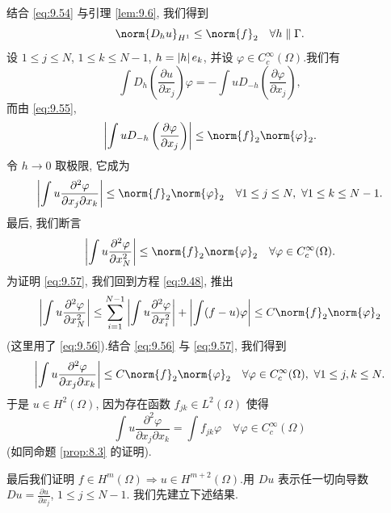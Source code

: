 结合 \eqref{eq:9.54} 与引理  \ref{lem:9.6}, 我们得到
\begin{equation}
\norm{D_hu}_{H^1}\le\norm{f}_2\quad\forall h\parallel\Gamma.
\label{eq:9.55}
\end{equation}
设 $1\le j\le N$, $1\le k\le N-1$, $h=\left|h\right|e_k$, 并设
$\varphi\in C_c^\infty(\Omega)$.我们有
\begin{equation*}
\int D_h\left(\frac{\partial u}{\partial x_j}\right)\varphi
=-\int uD_{-h}\left(\frac{\partial\varphi}{\partial x_j}\right),
\end{equation*}
而由 \eqref{eq:9.55},
\begin{equation*}
\left|\int uD_{-h}\left(\frac{\partial\varphi}{\partial x_j}\right)\right|
\le\norm{f}_2\norm{\varphi}_2.
\end{equation*}
令 $h\to0$ 取极限, 它成为
\begin{equation}
\left|\int u\frac{\partial^2\varphi}{\partial x_j\partial x_k}\right|
\le\norm{f}_2\norm{\varphi}_2
\quad\forall1\le j\le N,\ \forall1\le k\le N-1.
\label{eq:9.56}
\end{equation}
最后, 我们断言
\begin{equation}
\left|\int u\frac{\partial^2\varphi}{\partial x_N^2}\right|
\le\norm{f}_2\norm{\varphi}_2\quad\forall\varphi\in C_c^\infty(\Omega).
\label{eq:9.57}
\end{equation}
为证明 \eqref{eq:9.57}, 我们回到方程 \eqref{eq:9.48}, 推出
\begin{equation*}
\left|\int u\frac{\partial^2\varphi}{\partial x_N^2}\right|
\le\sum_{i=1}^{N-1}\left|\int u\frac{\partial^2\varphi}{\partial x_i^2}\right|
+\left|\int(f-u)\varphi\right|\le C\norm{f}_2\norm{\varphi}_2
\end{equation*}
(这里用了 \eqref{eq:9.56}).结合 \eqref{eq:9.56} 与 \eqref{eq:9.57}, 我们得到
\begin{equation*}
\left|\int u\frac{\partial^2\varphi}{\partial x_j\partial x_k}\right|
\le C\norm{f}_2\norm{\varphi}_2
\quad\forall\varphi\in C_c^\infty(\Omega),\ \forall1\le j,k\le N.
\end{equation*}
于是 $u\in H^2(\Omega)$, 因为存在函数 $f_{jk}\in L^2(\Omega)$ 使得
\begin{equation*}
\int u\frac{\partial^2\varphi}{\partial x_j\partial x_k}
=\int f_{jk}\varphi\quad\forall\varphi\in C_c^\infty(\Omega)
\end{equation*}
(如同命题  \ref{prop:8.3} 的证明).

最后我们证明 $f\in H^m(\Omega)\Rightarrow u\in H^{m+2}(\Omega)$.用 $Du$
表示任一切向导数 $Du=\frac{\partial u}{\partial x_j}$, $1\le j\le N-1$.
我们先建立下述结果.

